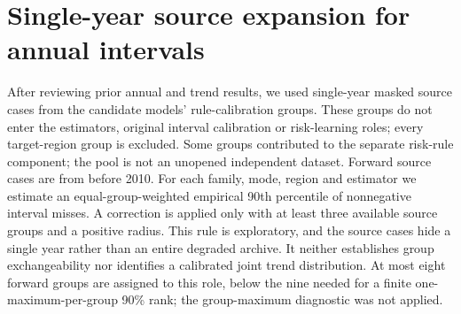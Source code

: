 \section{Single-year source expansion for annual intervals}
After reviewing prior annual and trend results, we used single-year masked source cases from the candidate models' rule-calibration groups. These groups do not enter the estimators, original interval calibration or risk-learning roles; every target-region group is excluded. Some groups contributed to the separate risk-rule component; the pool is not an unopened independent dataset. Forward source cases are from before 2010. For each family, mode, region and estimator we estimate an equal-group-weighted empirical 90th percentile of nonnegative interval misses. A correction is applied only with at least three available source groups and a positive radius. This rule is exploratory, and the source cases hide a single year rather than an entire degraded archive. It neither establishes group exchangeability nor identifies a calibrated joint trend distribution. At most eight forward groups are assigned to this role, below the nine needed for a finite one-maximum-per-group 90\% rank; the group-maximum diagnostic was not applied.
